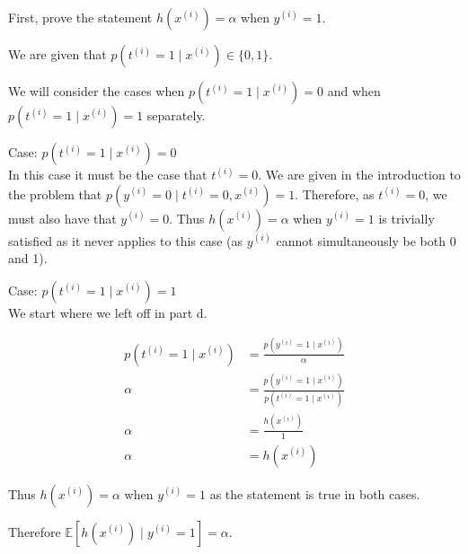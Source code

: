 \begin{answer}
	
First, prove the statement $h(x^{(i)}) = \alpha$ when $y^{(i)} = 1$.

We are given that $p(t^{(i)}=1\mid x^{(i)}) \in \{0,1\}$.

We will consider the cases when $p(t^{(i)}=1\mid x^{(i)}) = 0$ and when $p(t^{(i)}=1\mid x^{(i)}) = 1$ separately.

\smallskip

Case: $p(t^{(i)}=1\mid x^{(i)}) = 0$ \\
In this case it must be the case that $t^{(i)} = 0$.  We are given in the introduction to the problem that $p(y^{(i)}=0\mid t^{(i)} = 0, x^{(i)}) = 1$. Therefore, as $t^{(i)} = 0$, we must also have that $y^{(i)} = 0$. Thus $h(x^{(i)}) = \alpha$ when $y^{(i)} = 1$ is trivially satisfied as it never applies to this case (as $y^{(i)}$ cannot simultaneously be both 0 and 1).

\smallskip

Case: $p(t^{(i)}=1\mid x^{(i)}) = 1$ \\
We start where we left off in part d.

\begin{align}
p(t^{(i)}=1\mid x^{(i)}) & = \frac{p(y^{(i)}=1\mid x^{(i)})}{\alpha} \\
\alpha & = \frac{p(y^{(i)}=1\mid x^{(i)})}{p(t^{(i)}=1\mid x^{(i)})} \\
\alpha & = \frac{h(x^{(i)})}{1} \\
\alpha & = h(x^{(i)})
\end{align}

\smallskip

Thus $h(x^{(i)}) = \alpha$ when $y^{(i)} = 1$ as the statement is true in both cases.

Therefore $\mathbb{E}[h(x^{(i)})  \mid y^{(i)} = 1]= \alpha $.

\end{answer}
